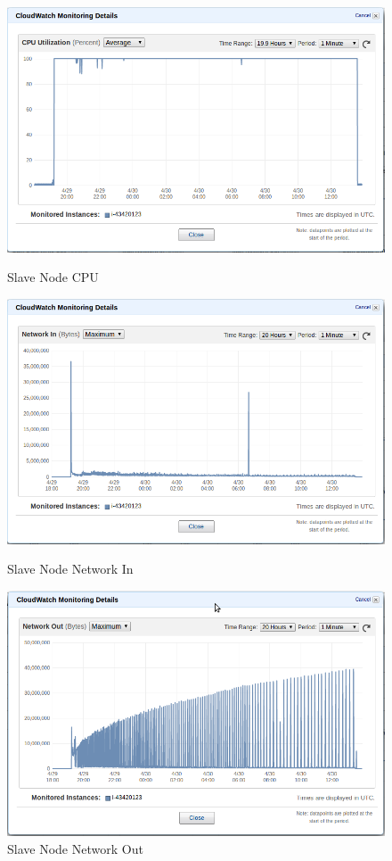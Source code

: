 \begin{figure}
  \includegraphics[width=\linewidth]{pics/slave_cpu.png}
  \caption{Slave Node CPU}\label{fig:slave_cpu}
\endminipage\hfill
{}
  \includegraphics[width=\linewidth]{pics/slave_network_in.png}
  \caption{Slave Node Network In}\label{fig:slave_in}
\endminipage\hfill
{}
  \includegraphics[width=\linewidth]{pics/slave_network_out.png}
  \caption{Slave Node Network Out}\label{fig:slave_out}
\endminipage\hfill
\end{figure}

